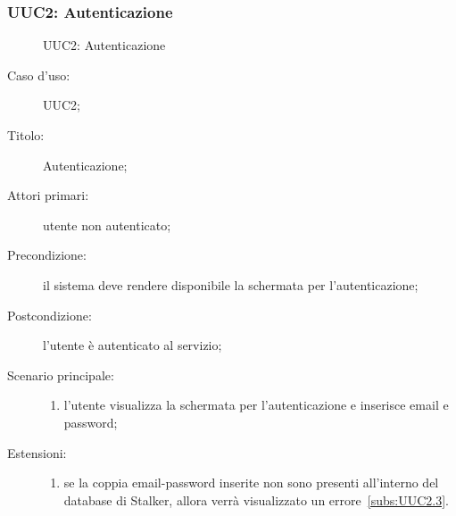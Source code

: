 \documentclass[../../../analisi-dei-requisiti.tex]{subfiles}
\begin{document}
\subsubsection{UUC2: Autenticazione}%
\label{subs:UUC2}

\begin{figure}[H]
  \centering
  \caption{UUC2: Autenticazione}%
  \label{fig:uuc2}
\end{figure}

\begin{description}
  \item[Caso d’uso:] UUC2;
  \item[Titolo:] Autenticazione;
  \item[Attori primari:] utente non autenticato;
  \item[Precondizione:] il sistema deve rendere disponibile la schermata per l'autenticazione;
  \item[Postcondizione:] l'utente è autenticato al servizio;
  \item[Scenario principale:]
        \begin{enumerate}
          \item l'utente visualizza la schermata per l'autenticazione e inserisce email e password;
        \end{enumerate}
  \item[Estensioni:]
        \begin{enumerate}
          \item se la coppia email-password inserite non sono presenti all'interno del database di Stalker, allora verrà visualizzato un errore~\ref{subs:UUC2.3}.
        \end{enumerate}
\end{description}
\end{document}
